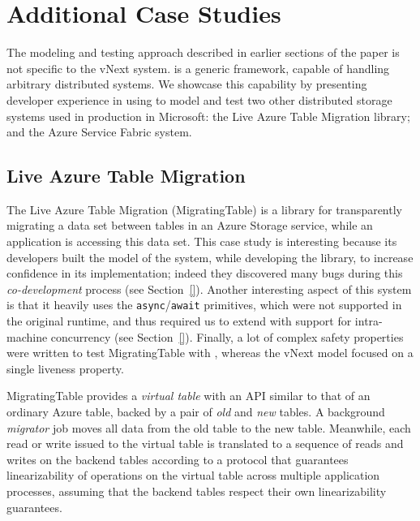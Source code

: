 \section{Additional Case Studies}
\label{sec:cases:other}

The modeling and testing approach described in earlier sections of the paper is not specific to the vNext system. \psharp is a generic framework, capable of handling arbitrary distributed systems. We showcase this capability by presenting developer experience in using \psharp to model and test two other distributed storage systems used in production in Microsoft: the Live Azure Table Migration library; and the Azure Service Fabric system.

\subsection{Live Azure Table Migration}
\label{sec:cases:migration}

The Live Azure Table Migration (MigratingTable) is a library for transparently migrating a data set between tables in an Azure Storage service, while an application is accessing this data set. This case study is interesting because its developers built the \psharp model of the system, while developing the library, to increase confidence in its implementation; indeed they discovered many bugs during this \emph{co-development} process (see Section~\ref{}). Another interesting aspect of this system is that it heavily uses the \texttt{async}/\texttt{await} primitives, which were not supported in the original \psharp runtime, and thus required us to extend \psharp with support for intra-machine concurrency (see Section~\ref{}). Finally, a lot of complex safety properties were written to test MigratingTable with \psharp, whereas the vNext model focused on a single liveness property.

MigratingTable provides a \emph{virtual table} with an API similar to that of an ordinary Azure table, backed by a pair of \emph{old} and \emph{new} tables.  A background \emph{migrator} job moves all data from the old table to the new table.  Meanwhile, each read or write issued to the virtual table is translated to a sequence of reads and writes on the backend tables according to a protocol that guarantees linearizability of operations on the virtual table across multiple application processes, assuming that the backend tables respect their own linearizability guarantees.


